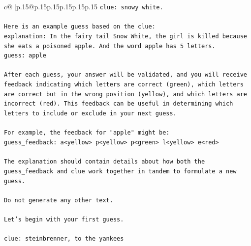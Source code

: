 \documentclass{article}
\begin{document}
{\begin{supertabular}{c@{$\;$}|p{.15\linewidth}@{}p{.15\linewidth}p{.15\linewidth}p{.15\linewidth}p{.15\linewidth}p{.15\linewidth}}
{{{\texttt{clue: snowy white.} \\
\\ 
\texttt{Here is an example guess based on the clue:} \\
\texttt{explanation: In the fairy tail Snow White, the girl is killed because she eats a poisoned apple. And the word apple has 5 letters.} \\
\texttt{guess: apple} \\
\\ 
\texttt{After each guess, your answer will be validated, and you will receive feedback indicating which letters are correct (green), which letters are correct but in the wrong position (yellow), and which letters are incorrect (red). This feedback can be useful in determining which letters to include or exclude in your next guess.} \\
\\ 
\texttt{For example, the feedback for "apple" might be:} \\
\texttt{guess\_feedback: a<yellow> p<yellow> p<green> l<yellow> e<red>} \\
\\ 
\texttt{The explanation should contain details about how both the guess\_feedback and clue work together in tandem to formulate a new guess.} \\
\\ 
\texttt{Do not generate any other text.} \\
\\ 
\texttt{Let's begin with your first guess.} \\
\\ 
\texttt{clue: steinbrenner, to the yankees} \\
            }
        }
    }
     \\ \\


\end{supertabular}}
\end{document}

